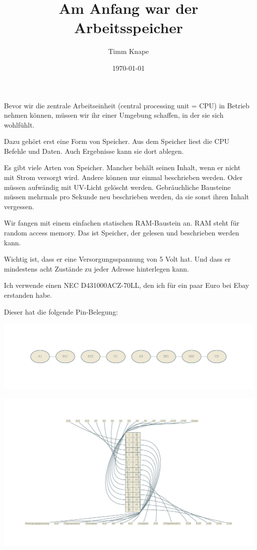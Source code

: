 \documentclass[a5paper,ngerman]{article}
\title{\color{emph}Am Anfang war der Arbeitsspeicher}
\author{Timm Knape}
\date{\today}
\begin{document}
\pagecolor{background}
\color{normal}
\allsectionsfont{\color{emph}\mdseries}
\pagestyle{plain}
\maketitle
\thispagestyle{fancy}

Bevor wir die zentrale Arbeitseinheit (central processing unit = CPU)
in Betrieb nehmen können,
müssen wir ihr einer Umgebung schaffen, in der sie sich wohlfühlt.

Dazu gehört erst eine Form von Speicher.
Aus dem Speicher liest die CPU Befehle und Daten.
Auch Ergebnisse kann sie dort ablegen.

Es gibt viele Arten von Speicher.
Mancher behält seinen Inhalt, wenn er nicht mit Strom versorgt wird.
Andere können nur einmal beschrieben werden.
Oder müssen aufwändig mit UV-Licht gelöscht werden.
Gebräuchliche Bausteine müssen mehrmals pro Sekunde neu beschrieben
werden, da sie sonst ihren Inhalt vergessen.

Wir fangen mit einem einfachen statischen RAM-Baustein an.
RAM steht für random access memory.
Das ist Speicher, der gelesen und beschrieben werden kann.

Wichtig ist, dass er eine Versorgungsspannung von 5 Volt hat.
Und dass er mindestens acht Zustände zu jeder Adresse hinterlegen kann.

Ich verwende einen NEC D431000ACZ-70LL, den ich für ein paar Euro bei
Ebay erstanden habe.

Dieser hat die folgende Pin-Belegung:

\centerline{\includegraphics[trim={1in .9in 1in .9in},clip]{imgs/dot-1-light.pdf}}

\centerline{\includegraphics[trim={1in .9in 1in .9in},clip]{imgs/dot-2-light.pdf}}
\end{document}
